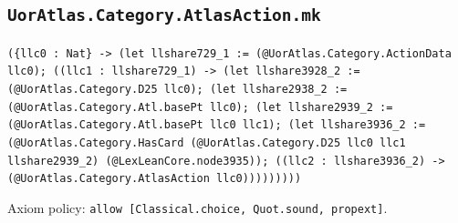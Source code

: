 \documentclass[11pt]{article}
\begin{document}
\subsection*{\texttt{UorAtlas.Category.AtlasAction.mk}}
\noindent\texttt{(\{llc0 : Nat\} -> (let llshare729\_1 := (@UorAtlas.Category.ActionData llc0); ((llc1 : llshare729\_1) -> (let llshare3928\_2 := (@UorAtlas.Category.D25 llc0); (let llshare2938\_2 := (@UorAtlas.Category.Atl.basePt llc0); (let llshare2939\_2 := (@UorAtlas.Category.Atl.basePt llc0 llc1); (let llshare3936\_2 := (@UorAtlas.Category.HasCard (@UorAtlas.Category.D25 llc0 llc1 llshare2939\_2) (@LexLeanCore.node3935)); ((llc2 : llshare3936\_2) -> (@UorAtlas.Category.AtlasAction llc0)))))))))}\par
\noindent Axiom policy: \texttt{allow [Classical.choice, Quot.sound, propext]}.\par
\end{document}

